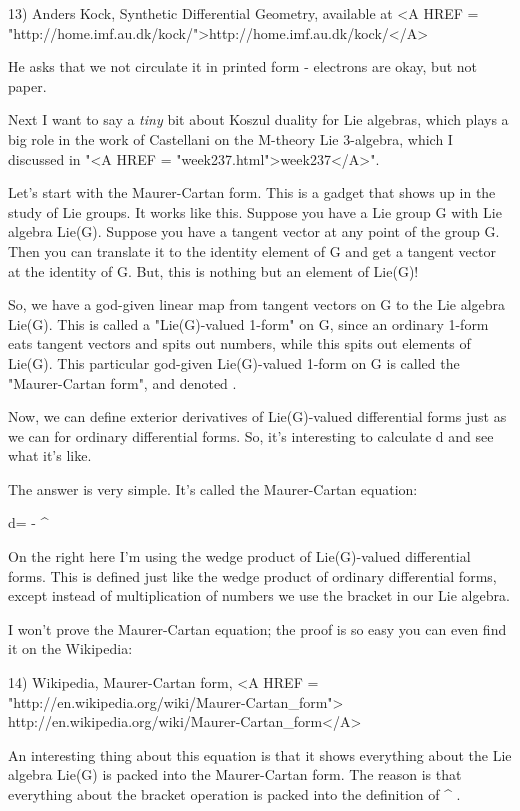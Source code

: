 13) Anders Kock, Synthetic Differential Geometry, available at
<A HREF = "http://home.imf.au.dk/kock/">http://home.imf.au.dk/kock/</A>

He asks that we not circulate it in printed form - electrons are 
okay, but not paper.

Next I want to say a \emph{tiny} bit about Koszul duality for Lie
algebras, which plays a big role in the work of Castellani on 
the M-theory Lie 3-algebra, which I discussed in "<A HREF = "week237.html">week237</A>".

Let's start with the Maurer-Cartan form.  This is a gadget that shows 
up in the study of Lie groups.  It works like this.  Suppose you have 
a Lie group G with Lie algebra Lie(G).  Suppose you have a tangent 
vector at any point of the group G.  Then you can translate it to the
identity element of G and get a tangent vector at the identity of G.  
But, this is nothing but an element of Lie(G)!

So, we have a god-given linear map from tangent vectors on G to the
Lie algebra Lie(G).  This is called a "Lie(G)-valued 1-form" on G,
since an ordinary 1-form eats tangent vectors and spits out numbers, 
while this spits out elements of Lie(G).  This particular god-given
Lie(G)-valued 1-form on G is called the "Maurer-Cartan form", and
denoted \omega .  

Now, we can define exterior derivatives of Lie(G)-valued differential
forms just as we can for ordinary differential forms.  So, it's 
interesting to calculate d \omega  and see what it's like.  

The answer is very simple.  It's called the Maurer-Cartan equation:

d\omega  = - \omega  ^ \omega 

On the right here I'm using the wedge product of Lie(G)-valued 
differential forms.  This is defined just like the wedge product of
ordinary differential forms, except instead of multiplication of
numbers we use the bracket in our Lie algebra.  

I won't prove the Maurer-Cartan equation; the proof is so easy you
can even find it on the Wikipedia:

14) Wikipedia, Maurer-Cartan form, 
<A HREF = "http://en.wikipedia.org/wiki/Maurer-Cartan_form">
http://en.wikipedia.org/wiki/Maurer-Cartan_form</A>

An interesting thing about this equation is that it shows 
everything about the Lie algebra Lie(G) is packed into the
Maurer-Cartan form.  The reason is that everything about the
bracket operation is packed into the definition of \omega  ^ \omega .

